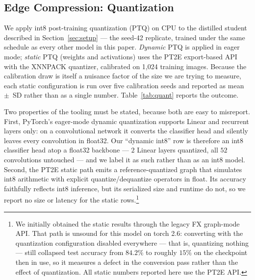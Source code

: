 \documentclass[conference]{IEEEtran}
\begin{document}
\subsection{Edge Compression: Quantization}
\label{sec:quant}

We apply int8 post-training quantization (PTQ) on CPU to the distilled student
described in Section~\ref{sec:setup} --- the seed-42 replicate, trained under the
same schedule as every other model in this paper. \emph{Dynamic} PTQ is applied
in eager mode; \emph{static} PTQ (weights and activations) uses the PT2E
export-based API with the XNNPACK quantizer, calibrated on 1{,}024 training
images. Because the calibration draw is itself a nuisance factor of the size we
are trying to measure, each static configuration is run over five calibration
seeds and reported as mean~$\pm$~SD rather than as a single number.
Table~\ref{tab:quant} reports the outcome.

Two properties of the tooling must be stated, because both are easy to
misreport. First, PyTorch's eager-mode dynamic quantization supports Linear and
recurrent layers only: on a convolutional network it converts the classifier
head and silently leaves every convolution in float32. Our ``dynamic int8''
row is therefore an int8 classifier head atop a float32 backbone --- $2$ Linear
layers quantized, all $52$ convolutions untouched --- and we label it as such
rather than as an int8 model. Second, the PT2E static path emits a
reference-quantized graph that simulates int8 arithmetic with explicit
quantize/dequantize operators in float. Its accuracy faithfully reflects int8
inference, but its serialized size and runtime do not, so we report no size or
latency for the static rows.\footnote{We initially obtained the static results
through the legacy FX graph-mode API. That path is unsound for this model on
torch 2.6: converting with the quantization configuration disabled everywhere ---
that is, quantizing nothing --- still collapsed test accuracy from $84.2\%$ to
roughly $15\%$ on the checkpoint then in use, so it measures a defect in the
conversion pass rather than the effect of quantization. All static numbers
reported here use the PT2E API.}
\end{document}
